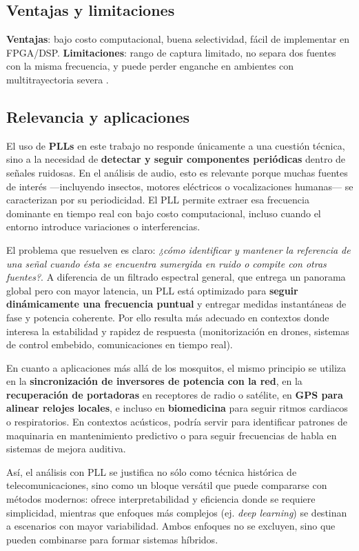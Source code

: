 \subsection{Ventajas y limitaciones}

\textbf{Ventajas}: bajo costo computacional, buena selectividad, fácil de implementar en FPGA/DSP.  
\textbf{Limitaciones}: rango de captura limitado, no separa dos fuentes con la misma frecuencia, 
y puede perder enganche en ambientes con multitrayectoria severa \cite{Collins2018}.

\subsection{Relevancia y aplicaciones}

El uso de \textbf{PLLs} en este trabajo no responde únicamente a una cuestión técnica, 
sino a la necesidad de \textbf{detectar y seguir componentes periódicas} dentro de señales ruidosas.  
En el análisis de audio, esto es relevante porque muchas fuentes de interés —incluyendo insectos, 
motores eléctricos o vocalizaciones humanas— se caracterizan por su periodicidad.  
El PLL permite extraer esa frecuencia dominante en tiempo real con bajo costo computacional, 
incluso cuando el entorno introduce variaciones o interferencias.

El problema que resuelven es claro: \textit{¿cómo identificar y mantener la referencia de una señal 
	cuando ésta se encuentra sumergida en ruido o compite con otras fuentes?}.  
A diferencia de un filtrado espectral general, que entrega un panorama global pero con mayor latencia, 
un PLL está optimizado para \textbf{seguir dinámicamente una frecuencia puntual} y entregar medidas 
instantáneas de fase y potencia coherente.  
Por ello resulta más adecuado en contextos donde interesa la estabilidad y rapidez de respuesta 
(monitorización en drones, sistemas de control embebido, comunicaciones en tiempo real).

En cuanto a aplicaciones más allá de los mosquitos, el mismo principio se utiliza en la 
\textbf{sincronización de inversores de potencia con la red}, en la \textbf{recuperación de portadoras} 
en receptores de radio o satélite, en \textbf{GPS para alinear relojes locales}, 
e incluso en \textbf{biomedicina} para seguir ritmos cardiacos o respiratorios.  
En contextos acústicos, podría servir para identificar patrones de maquinaria en mantenimiento predictivo 
o para seguir frecuencias de habla en sistemas de mejora auditiva.

Así, el análisis con PLL se justifica no sólo como técnica histórica de telecomunicaciones, 
sino como un bloque versátil que puede compararse con métodos modernos:  
ofrece interpretabilidad y eficiencia donde se requiere simplicidad, 
mientras que enfoques más complejos (ej. \emph{deep learning}) se destinan a escenarios con mayor variabilidad.  
Ambos enfoques no se excluyen, sino que pueden combinarse para formar sistemas híbridos.



